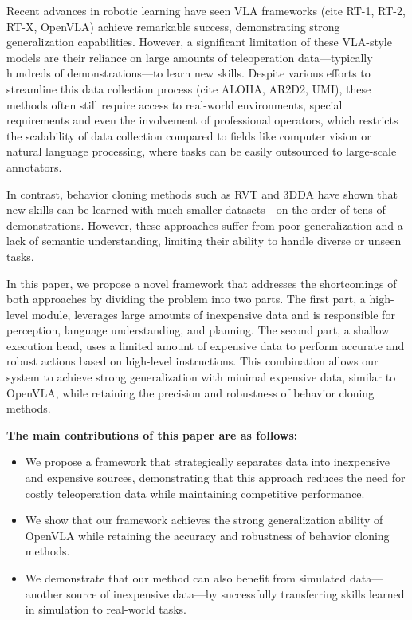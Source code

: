 Recent advances in robotic learning have seen VLA frameworks (cite RT-1, RT-2, RT-X, OpenVLA) achieve remarkable success, demonstrating strong generalization capabilities. However, a significant limitation of these VLA-style models are their reliance on large amounts of teleoperation data—typically hundreds of demonstrations—to learn new skills. 
Despite various efforts to streamline this data collection process (cite ALOHA, AR2D2, UMI), these methods often still require access to real-world environments, special requirements and even the involvement of professional operators, which restricts the scalability of data collection compared to fields like computer vision or natural language processing, where tasks can be easily outsourced to large-scale annotators.

In contrast, behavior cloning methods such as RVT and 3DDA have shown that new skills can be learned with much smaller datasets—on the order of tens of demonstrations.  
 However, these approaches suffer from poor generalization and a lack of semantic understanding, limiting their ability to handle diverse or unseen tasks.

In this paper, we propose a novel framework that addresses the shortcomings of both approaches by dividing the problem into two parts. The first part, a high-level module, leverages large amounts of inexpensive data and is responsible for perception, language understanding, and planning. 
The second part, a shallow execution head, uses a limited amount of expensive data to perform accurate and robust actions based on high-level instructions. This combination allows our system to achieve strong generalization with minimal expensive data, similar to OpenVLA, while retaining the precision and robustness of behavior cloning methods.

\textbf{The main contributions of this paper are as follows:}
\begin{itemize}
    \item We propose a framework that strategically separates data into inexpensive and expensive sources, demonstrating that this approach reduces the need for costly teleoperation data while maintaining competitive performance.
    \item We show that our framework achieves the strong generalization ability of OpenVLA while retaining the accuracy and robustness of behavior cloning methods.
    \item We demonstrate that our method can also benefit from simulated data—another source of inexpensive data—by successfully transferring skills learned in simulation to real-world tasks.
\end{itemize}

